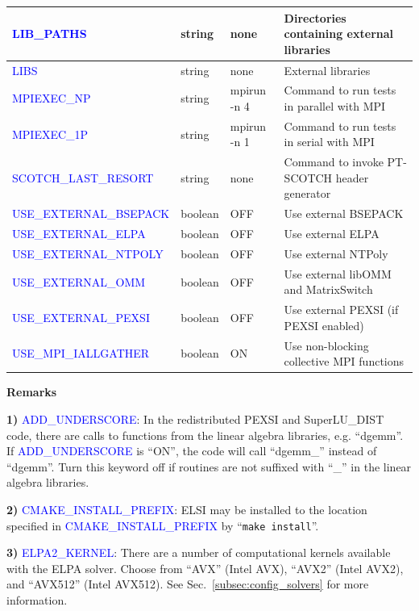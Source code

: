 \documentclass{report}
\newcommand{\tcb}[1]{\textcolor{blue}{#1}}
\begin{document}
\begin{longtable}[]{|p{50mm}|p{15mm}|p{20mm}|p{80mm}|}
\hline
\tcb{LIB\_PATHS}               & string  & none        & Directories containing external libraries\\
\hline
\tcb{LIBS}                     & string  & none        & External libraries\\
\hline
\tcb{MPIEXEC\_NP}              & string  & mpirun -n 4 & Command to run tests in parallel with MPI\\
\hline
\tcb{MPIEXEC\_1P}              & string  & mpirun -n 1 & Command to run tests in serial with MPI\\
\hline
\tcb{SCOTCH\_LAST\_RESORT}     & string  & none        & Command to invoke PT-SCOTCH header generator\\
\hline
\tcb{USE\_EXTERNAL\_BSEPACK}   & boolean & OFF         & Use external BSEPACK\\
\hline
\tcb{USE\_EXTERNAL\_ELPA}      & boolean & OFF         & Use external ELPA\\
\hline
\tcb{USE\_EXTERNAL\_NTPOLY}    & boolean & OFF         & Use external NTPoly\\
\hline
\tcb{USE\_EXTERNAL\_OMM}       & boolean & OFF         & Use external libOMM and MatrixSwitch\\
\hline
\tcb{USE\_EXTERNAL\_PEXSI}     & boolean & OFF         & Use external PEXSI (if PEXSI enabled)\\
\hline
\tcb{USE\_MPI\_IALLGATHER}     & boolean & ON          & Use non-blocking collective MPI functions\\
\hline
\end{longtable}

\textbf{Remarks}

\textbf{1)} \tcb{ADD\_UNDERSCORE}: In the redistributed PEXSI and SuperLU\_DIST code, there are calls to functions from the linear algebra libraries, e.g. ``dgemm''. If \tcb{ADD\_UNDERSCORE} is ``ON'', the code will call ``dgemm\_'' instead of ``dgemm''. Turn this keyword off if routines are not suffixed with ``\_'' in the linear algebra libraries.

\textbf{2)} \tcb{CMAKE\_INSTALL\_PREFIX}: ELSI may be installed to the location specified in \tcb{CMAKE\_INSTALL\_PREFIX} by ``\verb+make install+''.

\textbf{3)} \tcb{ELPA2\_KERNEL}: There are a number of computational kernels available with the ELPA solver. Choose from ``AVX'' (Intel AVX), ``AVX2'' (Intel AVX2), and ``AVX512'' (Intel AVX512). See Sec.~\ref{subsec:config_solvers} for more information.
\end{document}
